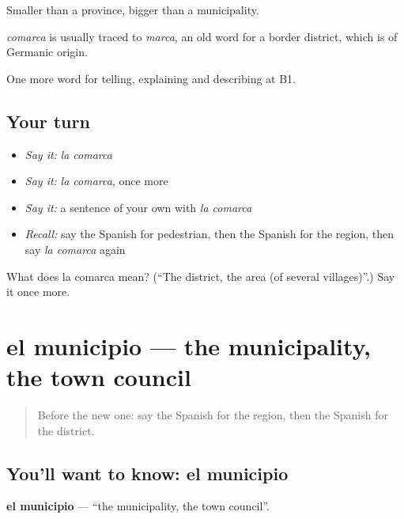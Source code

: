 Smaller than a province, bigger than a municipality.

\begin{cousinweb}
\emph{comarca} is usually traced to \emph{marca}, an old word for a border district, which is of Germanic origin.
\end{cousinweb}

\begin{grammarlens}[title={What you've built}]
One more word for telling, explaining and describing at B1.
\end{grammarlens}

\subsection*{Your turn}
\begin{itemize}
\raggedright
  \item \emph{Say it:} \emph{la comarca}
  \item \emph{Say it:} \emph{la comarca}, once more
  \item \emph{Say it:} a sentence of your own with \emph{la comarca}
  \item \emph{Recall:} say the Spanish for pedestrian, then the Spanish for the region, then say \emph{la comarca} again
\end{itemize}

\begin{tcolorbox}[breakable,colback=teal!4,colframe=teal!35!black,title={Before you move on}]
What does la comarca mean? (\textquotedblleft{}The district, the area (of several villages)\textquotedblright{}.) Say it once more.
\end{tcolorbox}
\section[el municipio]{el municipio — the municipality, the town council}

\label{lesson:ES-C683-municipio}



\begin{quote}
Before the new one: say the Spanish for the region, then the Spanish for the district.
\end{quote}

\subsection*{You'll want to know: el municipio}
\textbf{el municipio} — \textquotedblleft{}the municipality, the town council\textquotedblright{}.

